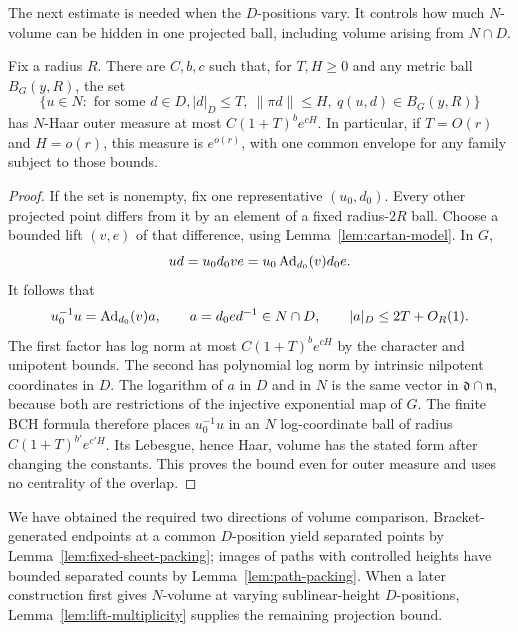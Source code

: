 The next estimate is needed when the $D$-positions vary. It
controls how much $N$-volume can be hidden in one projected ball,
including volume arising from $N\cap D$.

\begin{lemma}\label{lem:lift-multiplicity}
Fix a radius $R$. There are $C,b,c$ such that, for $T,H\ge0$ and
any metric ball $B_G(y,R)$, the set
\[
 \{u\in N:\text{ for some }d\in D, |d|_D\le T,
 \ \|\pi d\|\le H,\ q(u,d)\in B_G(y,R)\}
\]
has $N$-Haar outer measure at most
$C(1+T)^b e^{cH}$. In particular, if $T=O(r)$ and $H=o(r)$,
this measure is $e^{o(r)}$, with one common envelope for any
family subject to those bounds.
\end{lemma}

\begin{proof}
If the set is nonempty, fix one representative $(u_0,d_0)$.
Every other projected point differs from it by an element of a
fixed radius-$2R$ ball. Choose a bounded lift $(v,e)$ of that
difference, using Lemma~\ref{lem:cartan-model}. In $G$,
\[
 ud=u_0d_0ve=u_0\operatorname{Ad}_{d_0}(v)d_0e.
\]
It follows that
\begin{equation}\label{eq:overlap-multiplicity-formula}
 u_0^{-1}u=\operatorname{Ad}_{d_0}(v)a,
 \qquad a=d_0ed^{-1}\in N\cap D,
 \qquad |a|_D\le2T+O_R(1).
\end{equation}
The first factor has log norm at most
$C(1+T)^b e^{cH}$ by the character and unipotent bounds.
The second has polynomial log norm by intrinsic nilpotent
coordinates in $D$. The logarithm of $a$ in $D$ and in $N$ is
the same vector in $\mathfrak d\cap\mathfrak n$, because both
are restrictions of the injective exponential map of $G$.
The finite BCH formula therefore places $u_0^{-1}u$ in an
$N$ log-coordinate ball of radius
$C(1+T)^{b'}e^{c'H}$. Its Lebesgue, hence Haar, volume has the
stated form after changing the constants. This proves the bound
even for outer measure and uses no centrality of the overlap.
\end{proof}

We have obtained the required two directions of volume comparison.
Bracket-generated endpoints at a common $D$-position yield separated
points by Lemma~\ref{lem:fixed-sheet-packing}; images of paths with
controlled heights have bounded separated counts by
Lemma~\ref{lem:path-packing}. When a later construction first gives
$N$-volume at varying sublinear-height $D$-positions,
Lemma~\ref{lem:lift-multiplicity} supplies the remaining projection
bound.
